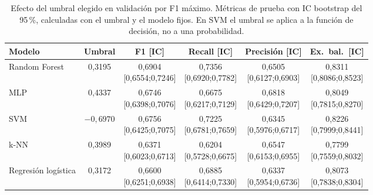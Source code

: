 \documentclass[journal]{IEEEtran}
\begin{document}
\begin{table}[t]
\centering
\caption{Efecto del umbral elegido en validación por F1 máximo. Métricas de prueba con IC
bootstrap del 95\,\%, calculadas con el umbral y el modelo fijos. En SVM el umbral se aplica a la
función de decisión, no a una probabilidad.}
\label{tab:umbral}
\scriptsize
\renewcommand{\arraystretch}{1.06}
\setlength{\tabcolsep}{3pt}
\begin{tabular}{lccccc}
\toprule
\textbf{Modelo} & \textbf{Umbral} & \textbf{F1 [IC]} & \textbf{Recall [IC]} & \textbf{Precisión [IC]} & \textbf{Ex.\ bal.\ [IC]} \\
\midrule
Random Forest & 0{,}3195 & \makecell{0{,}6904\\{[0{,}6554;0{,}7246]}} & \makecell{0{,}7356\\{[0{,}6920;0{,}7782]}} & \makecell{0{,}6505\\{[0{,}6127;0{,}6903]}} & \makecell{0{,}8311\\{[0{,}8086;0{,}8523]}} \\
MLP & 0{,}4337 & \makecell{0{,}6746\\{[0{,}6398;0{,}7076]}} & \makecell{0{,}6675\\{[0{,}6217;0{,}7129]}} & \makecell{0{,}6818\\{[0{,}6429;0{,}7207]}} & \makecell{0{,}8049\\{[0{,}7815;0{,}8270]}} \\
SVM & $-0{,}6970$ & \makecell{0{,}6756\\{[0{,}6425;0{,}7075]}} & \makecell{0{,}7225\\{[0{,}6781;0{,}7659]}} & \makecell{0{,}6345\\{[0{,}5976;0{,}6717]}} & \makecell{0{,}8226\\{[0{,}7999;0{,}8441]}} \\
k-NN & 0{,}3989 & \makecell{0{,}6371\\{[0{,}6023;0{,}6713]}} & \makecell{0{,}6204\\{[0{,}5728;0{,}6675]}} & \makecell{0{,}6547\\{[0{,}6153;0{,}6955]}} & \makecell{0{,}7799\\{[0{,}7559;0{,}8032]}} \\
Regresión logística & 0{,}3172 & \makecell{0{,}6600\\{[0{,}6251;0{,}6938]}} & \makecell{0{,}6885\\{[0{,}6414;0{,}7330]}} & \makecell{0{,}6337\\{[0{,}5954;0{,}6736]}} & \makecell{0{,}8073\\{[0{,}7838;0{,}8304]}} \\
\bottomrule
\end{tabular}
\end{table}
\end{document}

